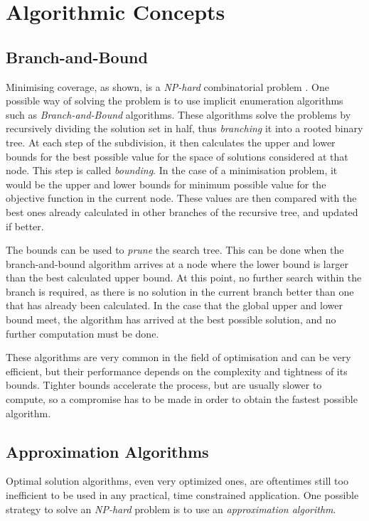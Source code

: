 \section{Algorithmic Concepts}
\subsection{Branch-and-Bound}
Minimising coverage, as shown, is a \emph{NP-hard} combinatorial problem \cite{complex}. One possible way of solving the problem is to use implicit enumeration algorithms such as \emph{Branch-and-Bound} algorithms.
These algorithms solve the problems by recursively dividing the solution set in half, thus \emph{branching} it into a rooted binary tree.
At each step of the subdivision, it then calculates the upper and lower bounds for the best possible value for the space of solutions considered at that node. This step is called \emph{bounding}.
In the case of a minimisation problem, it would be the upper and lower bounds for minimum possible value for the objective function in the current node. These values are then compared with the best ones already calculated in other branches of the recursive tree, and updated if better.

The bounds can be used to \emph{prune} the search tree. This can be done when the branch-and-bound algorithm arrives at a node where the lower bound is larger than the best calculated upper bound. At this point, no further search within the branch is required, as there is no solution in the current branch better than one that has already been calculated. 
In the case that the global upper and lower bound meet, the algorithm has arrived at the best possible solution, and no further computation must be done.

These algorithms are very common in the field of optimisation and can be very efficient, but their performance depends on the complexity and tightness of its bounds. Tighter bounds accelerate the process, but are usually slower to compute, so a compromise has to be made in order to obtain the fastest possible algorithm.

\subsection{Approximation Algorithms}
Optimal solution algorithms, even very optimized ones, are oftentimes still too inefficient to be used in any practical, time constrained application. One possible strategy to solve an \emph{NP-hard} problem is to use an \emph{approximation algorithm}.

